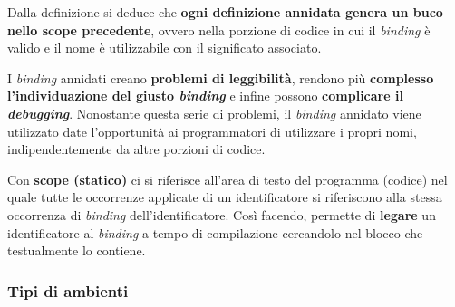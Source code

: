 \documentclass[a4paper]{article}
\begin{document}
	\noindent
	Dalla definizione si deduce che \textbf{ogni definizione annidata genera un buco nello scope precedente}, ovvero nella porzione di codice in cui il \emph{binding} è valido e il nome è utilizzabile con il significato associato.
	
	I \emph{binding} annidati creano \textbf{problemi di leggibilità}, rendono più \textbf{complesso l'individuazione del giusto \emph{binding}} e infine possono \textbf{complicare il \emph{debugging}}. Nonostante questa serie di problemi, il \emph{binding} annidato viene utilizzato date l'opportunità ai programmatori di utilizzare i propri nomi, indipendentemente da altre porzioni di codice.
	
	\begin{boxdef}
		Con \textcolor{Red3}{\textbf{scope (statico)}} ci si riferisce all'area di testo del programma (codice) nel quale tutte le occorrenze applicate di un identificatore si riferiscono alla stessa occorrenza di \emph{binding} dell'identificatore. Così facendo, permette di \textbf{legare} un identificatore al \emph{binding} a tempo di compilazione cercandolo nel blocco che testualmente lo contiene.
	\end{boxdef}\newpage
 	
 	\subsubsection{Tipi di ambienti}
 	
\end{document}
